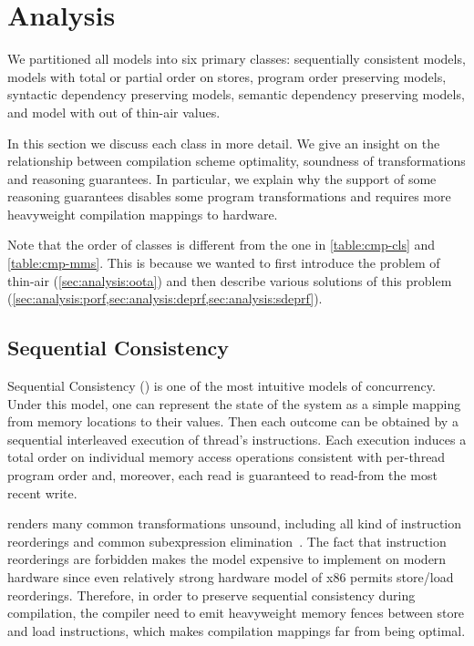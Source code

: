 \section{Analysis}
\label{sec:analysis}

We partitioned all models into six primary classes: 
sequentially consistent models, models with total or partial order on stores, 
program order preserving models, syntactic dependency preserving models, 
semantic dependency preserving models, and model with out of thin-air values.

In this section we discuss each class in more detail.
We give an insight on the relationship between compilation scheme optimality, 
soundness of transformations and reasoning guarantees.
In particular, we explain why the support of some reasoning guarantees 
disables some program transformations and requires more heavyweight 
compilation mappings to hardware.

Note that the order of classes is different from the one 
in \cref{table:cmp-cls} and \cref{table:cmp-mms}.
This is because we wanted to first introduce the problem 
of thin-air (\cref{sec:analysis:oota}) and then describe 
various solutions of this problem
(\cref{sec:analysis:porf,sec:analysis:deprf,sec:analysis:sdeprf}).



\subsection{Sequential Consistency}

Sequential Consistency (\SC) is one of the most intuitive models of concurrency.
Under this model, one can represent the state of the system as 
a simple mapping from memory locations to their values. 
Then each outcome can be obtained by a sequential interleaved execution 
of thread's instructions. Each execution induces a total order 
on individual memory access operations consistent with per-thread program order
and, moreover, each read is guaranteed to read-from the most recent write. 

\SC renders many common transformations unsound, 
including all kind of instruction reorderings and 
common subexpression elimination~\cite{Marino-al:PLDI11, Sevcik-Aspinall:ECOOP08}.
The fact that instruction reorderings are forbidden 
makes the model expensive to implement on modern hardware
since even relatively strong hardware model of x86
permits store/load reorderings.
Therefore, in order to preserve sequential consistency during compilation,
the compiler need to emit heavyweight memory fences between store and load instructions,
which makes compilation mappings far from being optimal.  


